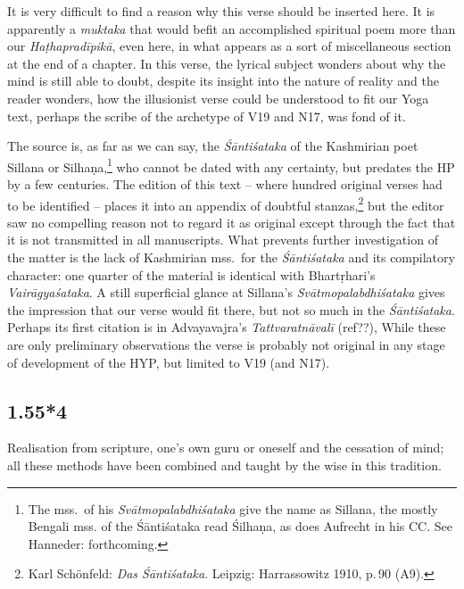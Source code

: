 \begin{ekdosis}
\begin{testimonia}[hp01_055_3]
\end{testimonia}

\begin{philcomm}[hp01_055_3]
It is very difficult to find a reason why this verse should be inserted here. It is apparently a
\emph{muktaka} that would befit an accomplished spiritual poem more than our \emph{Haṭhapradīpikā},
even here, in what appears as a sort of miscellaneous section at the end of a chapter.  In this
verse, the lyrical subject wonders about why the mind is still able to doubt, despite its insight
into the nature of reality and the reader wonders, how the illusionist verse could be understood to
fit our Yoga text, perhaps the scribe of the archetype of V19 and N17, was fond of it.

The source is, as far as we can say, the \emph{Śāntiśataka} of the Kashmirian poet Sillana or
Silhaṇa,\footnote{The mss.\ of his \emph{Svātmopalabdhiśataka} give the name as Sillana, the mostly
Bengali mss. of the Śāntiśataka read Śilhaṇa, as does Aufrecht in his CC. See Hanneder:
forthcoming.} who cannot be dated with any certainty, but predates the HP by a few centuries. The
edition of this text – where hundred original verses had to be identified – places it into an
appendix of doubtful stanzas,\footnote{Karl Schönfeld: \emph{Das Śāntiśataka}. Leipzig:
Harrassowitz 1910, p.\,90 (A9).} but the editor saw no compelling reason not to regard it as
original except through the fact that it is not transmitted in all manuscripts.  What prevents
further investigation of the matter is the lack of Kashmirian mss.\ for the \emph{Śāntiśataka} and
its compilatory character: one quarter of the material is identical with Bhartṛhari's
\emph{Vairāgyaśataka}. A still superficial glance at Sillana's \emph{Svātmopalabdhiśataka} gives
the impression that our verse would fit there, but not so much in the \emph{Śāntiśataka}. Perhaps its first citation is in Advayavajra’s \emph{Tattva\-ratnāvalī} (ref??),  While
these are only preliminary observations the verse is probably not original in any stage of
development of the HYP, but limited to V19 (and N17).
\end{philcomm}

\subsection*{1.55*4}
\begin{translation}[hp01_055_4]
Realisation from scripture, one's own guru or oneself and the cessation of mind; all these methods have been combined and taught by the wise in this tradition.
\end{translation}


\end{ekdosis}
